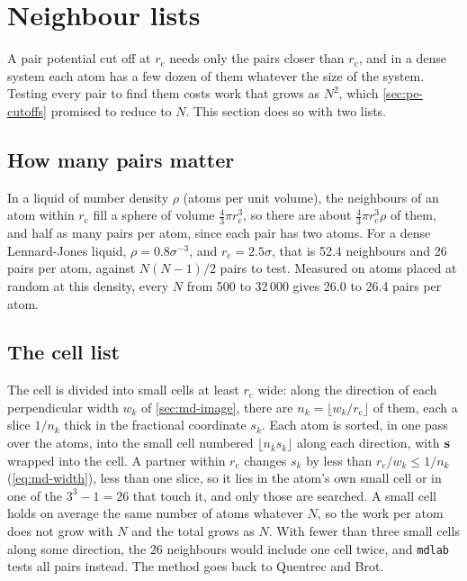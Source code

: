 \section{Neighbour lists}
\label{sec:md-neighbours}

A pair potential cut off at $r_{\mathrm c}$ needs only the pairs closer than
$r_{\mathrm c}$, and in a dense system each atom has a few dozen of them
whatever the size of the system. Testing every pair to find them costs
work that grows as $N^2$, which \cref{sec:pe-cutoffs} promised to reduce
to $N$. This section does so with two lists.

\subsection*{How many pairs matter}

In a liquid of number density $\rho$ (atoms per unit volume), the
neighbours of an atom within $r_{\mathrm c}$ fill a sphere of volume
$\frac43\pi r_{\mathrm c}^3$, so there are about $\frac43\pi r_{\mathrm
c}^3\rho$ of them, and half as many pairs per atom, since each pair has
two atoms. For a dense Lennard-Jones liquid, $\rho = 0.8\sigma^{-3}$, and
$r_{\mathrm c} = 2.5\sigma$, that is 52.4 neighbours and 26 pairs per
atom, against $N(N - 1)/2$ pairs to test. Measured on atoms placed at
random at this density, every $N$ from 500 to 32\,000 gives 26.0 to 26.4
pairs per atom.

\subsection*{The cell list}

The cell is divided into small cells at least $r_{\mathrm c}$ wide: along
the direction of each perpendicular width $w_k$ of \cref{sec:md-image},
there are $n_k = \lfloor w_k/r_{\mathrm c}\rfloor$ of them, each a slice
$1/n_k$ thick in the fractional coordinate $s_k$. Each atom is sorted, in
one pass over the atoms, into the small cell numbered $\lfloor
n_ks_k\rfloor$ along each direction, with $\bm{\mathrm{s}}$ wrapped into the cell.
A partner within $r_{\mathrm c}$ changes $s_k$ by less than $r_{\mathrm
c}/w_k \le 1/n_k$ (\cref{eq:md-width}), less than one slice, so it lies
in the atom's own small cell or in one of the $3^3 - 1 = 26$ that touch
it, and only those are searched. A small cell holds on average the same number of
atoms whatever $N$, so the work per atom does not grow with $N$ and the
total grows as $N$. With fewer than three small cells along some
direction, the 26 neighbours would include one cell twice, and
\texttt{mdlab} tests all pairs instead. The method goes back to Quentrec
and Brot\cite{QuentrecBrot1973}.

